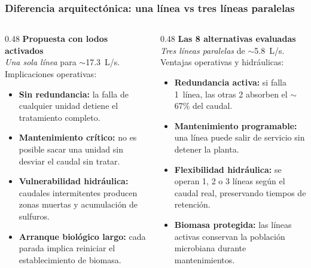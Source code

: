 \documentclass[aspectratio=169]{beamer}
\begin{document}
\begin{frame}
\frametitle{Diferencia arquitect\'{o}nica: una l\'{i}nea vs tres l\'{i}neas paralelas}
\begin{columns}[T]
\begin{column}{0.48\textwidth}
\textbf{Propuesta con lodos activados}\\[2pt]
\footnotesize
\textit{Una sola l\'{i}nea} para $\sim$17.3~L/s.\\[2pt]
\textcolor{rojomalo}{Implicaciones operativas:}
\begin{itemize}
\setlength{\itemsep}{0pt}
\setlength{\topsep}{1pt}
\item \textbf{Sin redundancia:} la falla de cualquier unidad detiene el tratamiento completo.
\item \textbf{Mantenimiento cr\'{i}tico:} no es posible sacar una unidad sin desviar el caudal sin tratar.
\item \textbf{Vulnerabilidad hidr\'{a}ulica:} caudales intermitentes producen zonas muertas y acumulaci\'{o}n de sulfuros.
\item \textbf{Arranque biol\'{o}gico largo:} cada parada implica reiniciar el establecimiento de biomasa.
\end{itemize}
\end{column}
\begin{column}{0.48\textwidth}
\textbf{Las 8 alternativas evaluadas}\\[2pt]
\footnotesize
\textit{Tres l\'{i}neas paralelas} de $\sim$5.8~L/s.\\[2pt]
\textcolor{verdebueno}{Ventajas operativas y hidr\'{a}ulicas:}
\begin{itemize}
\setlength{\itemsep}{0pt}
\setlength{\topsep}{1pt}
\item \textbf{Redundancia activa:} si falla 1~l\'{i}nea, las otras 2 absorben el $\sim$67\% del caudal.
\item \textbf{Mantenimiento programable:} una l\'{i}nea puede salir de servicio sin detener la planta.
\item \textbf{Flexibilidad hidr\'{a}ulica:} se operan 1, 2 o 3 l\'{i}neas seg\'{u}n el caudal real, preservando tiempos de retenci\'{o}n.
\item \textbf{Biomasa protegida:} las l\'{i}neas activas conservan la poblaci\'{o}n microbiana durante mantenimientos.
\end{itemize}
\end{column}
\end{columns}
\end{frame}
\end{document}
